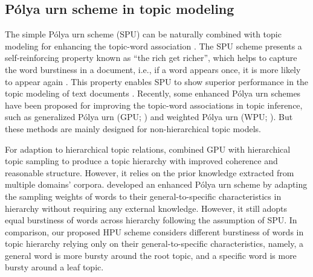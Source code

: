 \subsection{P\'olya urn scheme in topic modeling}
The simple P\'olya urn scheme (SPU) can be naturally combined with topic modeling for enhancing the topic-word association \citep{mahmoud2008polya}.
The SPU scheme presents a self-reinforcing property known as “the rich get richer”, which helps to capture the word burstiness in a document, i.e., if a word appears once, it is more likely to appear again \citep{doyle2009accounting}.
This property enables SPU to show superior performance in the topic modeling of text documents \citep{wordburstiness}.
Recently, some enhanced P\'olya urn schemes have been proposed for improving the topic-word associations in topic inference, such as generalized P\'olya urn (GPU; \citealt{gpu-li2016topic}) and weighted P\'olya urn (WPU; \citealt{wpu-wang2020optimising}). But these methods are mainly designed for non-hierarchical topic models. 

For adaption to hierarchical topic relations, \citet{xu2018hierarchical} combined GPU with hierarchical topic sampling to produce a topic hierarchy with improved coherence and reasonable structure. 
However, it relies on the prior knowledge extracted from multiple domains' corpora.
\citet{Liang2023} developed an enhanced P\'olya urn scheme by adapting the sampling weights of words to their general-to-specific characteristics in hierarchy without requiring any external knowledge. However, it still adopts equal burstiness of words across hierarchy following the assumption of SPU.
In comparison, our proposed HPU scheme considers different burstiness of words in topic hierarchy relying only on their general-to-specific characteristics, namely, a general word is more bursty around the root topic, and a specific word is more bursty around a leaf topic.